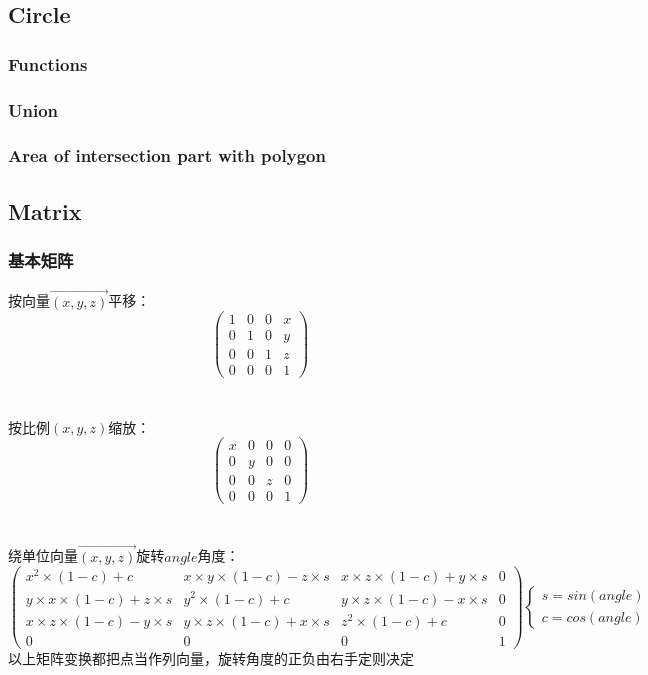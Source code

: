 \subsection{Circle}
\subsubsection{Functions}

\subsubsection{Union}

\subsubsection{Area of intersection part with polygon}


\subsection{Matrix}
\subsubsection{基本矩阵}
	按向量$\overrightarrow{(x,y,z)}$平移：
	\[\begin{pmatrix}
	1 & 0 & 0 & x\\ 
	0 & 1 & 0 & y\\ 
	0 & 0 & 1 & z\\ 
	0 & 0 & 0 & 1
	\end{pmatrix}\]\\
	\\
	按比例$(x,y,z)$缩放：
	\[\begin{pmatrix}
	x & 0 & 0 & 0\\ 
	0 & y & 0 & 0\\ 
	0 & 0 & z & 0\\ 
	0 & 0 & 0 & 1
	\end{pmatrix}\]\\
	\\
	绕单位向量$\overrightarrow{(x,y,z)}$旋转$angle$角度：
	\[\begin{pmatrix}
	x^2\times (1-c)+c & x\times y\times (1-c)-z\times s & x\times z\times (1-c)+y\times s & 0\\ 
	y\times x\times (1-c)+z\times s & y^2\times (1-c)+c & y\times z\times (1-c)-x\times s & 0\\ 
	x\times z\times (1-c)-y\times s & y\times z\times (1-c)+x\times s & z^2\times (1-c)+c & 0\\ 
	0 & 0 & 0 & 1
	\end{pmatrix}
	\begin{cases}
	s=sin(angle)\\
	c=cos(angle)
	\end{cases}\]
	以上矩阵变换都把点当作列向量，旋转角度的正负由右手定则决定\\

